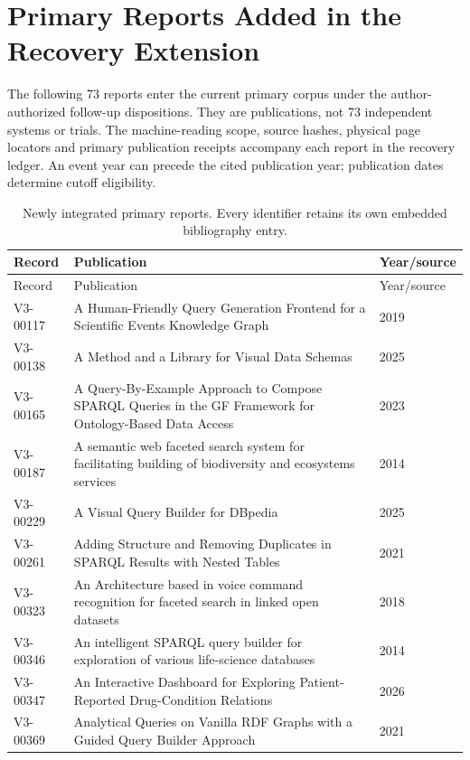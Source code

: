 \documentclass[manuscript,review,screen]{acmart}
\begin{document}
\section{Primary Reports Added in the Recovery Extension}\label{app:recovered-reports}
The following 73 reports enter the current primary corpus under the author-authorized follow-up dispositions. They are publications, not 73 independent systems or trials. The machine-reading scope, source hashes, physical page locators and primary publication receipts accompany each report in the recovery ledger. An event year can precede the cited publication year; publication dates determine cutoff eligibility.
\begin{longtable}{@{}L{21mm}L{107mm}L{17mm}@{}}
\caption{Newly integrated primary reports. Every identifier retains its own embedded bibliography entry.}\\
\toprule Record & Publication & Year/source\\\midrule
\endfirsthead
\toprule Record & Publication & Year/source\\\midrule
\endhead
\bottomrule\endfoot
V3-00117 & A Human-Friendly Query Generation Frontend for a Scientific Events Knowledge Graph & 2019 \citep{V3-00117}\\
V3-00138 & A Method and a Library for Visual Data Schemas & 2025 \citep{V3-00138}\\
V3-00165 & A Query-By-Example Approach to Compose SPARQL Queries in the GF Framework for Ontology-Based Data Access & 2023 \citep{V3-00165}\\
V3-00187 & A semantic web faceted search system for facilitating building of biodiversity and ecosystems services & 2014 \citep{V3-00187}\\
V3-00229 & A Visual Query Builder for DBpedia & 2025 \citep{V3-00229}\\
V3-00261 & Adding Structure and Removing Duplicates in SPARQL Results with Nested Tables & 2021 \citep{V3-00261}\\
V3-00323 & An Architecture based in voice command recognition for faceted search in linked open datasets & 2018 \citep{V3-00323}\\
V3-00346 & An intelligent SPARQL query builder for exploration of various life-science databases & 2014 \citep{V3-00346}\\
V3-00347 & An Interactive Dashboard for Exploring Patient-Reported Drug-Condition Relations & 2026 \citep{V3-00347}\\
V3-00369 & Analytical Queries on Vanilla RDF Graphs with a Guided Query Builder Approach & 2021 \citep{V3-00369}\\

\end{longtable}
\end{document}
